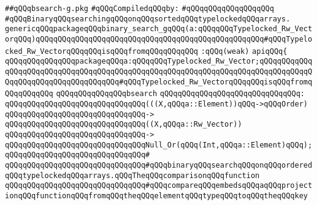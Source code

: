 \label{src/lib/src/bsearch-g.pkg}
\verb|##qQQqbsearch-g.pkg|\newline
\newline
\verb|#qQQqCompiledqQQqby:|\newline
\verb|#qQQqqQQqqQQqqQQqqQQq|\newline
\newline
\verb|#qQQqBinaryqQQqsearchingqQQqonqQQqsortedqQQqtypelockedqQQqarrays.|\newline
\newline
\newline
\verb|genericqQQqpackageqQQqbinary_search_gqQQq(a:qQQqqQQqTypelocked_Rw_VectorqQQq)qQQqqQQqqQQqqQQqqQQqqQQqqQQqqQQqqQQqqQQqqQQqqQQqqQQq#qQQqTypelocked_Rw_VectorqQQqqQQqisqQQqfromqQQqqQQqqQQq|\newline
\verb|:qQQq(weak)|\newline
\verb|apiqQQq{|\newline
\newline
\verb|qQQqqQQqqQQqqQQqpackageqQQqa:qQQqqQQqTypelocked_Rw_Vector;qQQqqQQqqQQqqQQqqQQqqQQqqQQqqQQqqQQqqQQqqQQqqQQqqQQqqQQqqQQqqQQqqQQqqQQqqQQqqQQqqQQqqQQqqQQqqQQqqQQqqQQqqQQq#qQQqTypelocked_Rw_VectorqQQqqQQqisqQQqfromqQQqqQQqqQQq|\newline
\newline
\verb|qQQqqQQqqQQqqQQqbsearch|\newline
\verb|qQQqqQQqqQQqqQQqqQQqqQQqqQQqqQQq:|\newline
\verb|qQQqqQQqqQQqqQQqqQQqqQQqqQQqqQQq(((X,qQQqa::Element))qQQq->qQQqOrder)|\newline
\verb|qQQqqQQqqQQqqQQqqQQqqQQqqQQqqQQq->|\newline
\verb|qQQqqQQqqQQqqQQqqQQqqQQqqQQqqQQq((X,qQQqa::Rw_Vector))|\newline
\verb|qQQqqQQqqQQqqQQqqQQqqQQqqQQqqQQq->|\newline
\verb|qQQqqQQqqQQqqQQqqQQqqQQqqQQqqQQqNull_Or(qQQq(Int,qQQqa::Element)qQQq);|\newline
\verb|qQQqqQQqqQQqqQQqqQQqqQQqqQQqqQQq#|\newline
\verb|qQQqqQQqqQQqqQQqqQQqqQQqqQQqqQQq#qQQqbinaryqQQqsearchqQQqonqQQqorderedqQQqtypelockedqQQqarrays.qQQqTheqQQqcomparisonqQQqfunction|\newline
\verb|qQQqqQQqqQQqqQQqqQQqqQQqqQQqqQQq#qQQqcompareqQQqembedsqQQqaqQQqprojectionqQQqfunctionqQQqfromqQQqtheqQQqelementqQQqtypeqQQqtoqQQqtheqQQqkey|\newline
